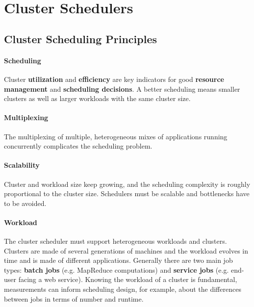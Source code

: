 \chapter{Cluster Schedulers}

\section{Cluster Scheduling Principles}
	\subsubsection{Scheduling}
	Cluster \textbf{utilization }and \textbf{efficiency }are key indicators for good \textbf{resource management }and \textbf{scheduling decisions}. A better scheduling means smaller clusters as well as larger workloads with the same cluster size.
	\subsubsection{Multiplexing}
	The multiplexing of multiple, heterogeneous mixes of applications running concurrently complicates the scheduling problem.
	\subsubsection{Scalability}
	Cluster and workload size keep growing, and the scheduling complexity is roughly proportional to the cluster size. Schedulers must be scalable and bottlenecks have to be avoided.
	\subsubsection{Workload}
	The cluster scheduler must support heterogeneous workloads and clusters.\newline
	Clusters are made of several generations of machines and the workload evolves in time and is made of different applications. Generally there are two main job types: \textbf{batch jobs} (e.g. MapReduce computations) and \textbf{service jobs} (e.g. end-user facing a web service).\newline
	Knowing the workload of a cluster is fundamental, measurements can inform scheduling design, for example, about the differences between jobs in terms of number and runtime.

